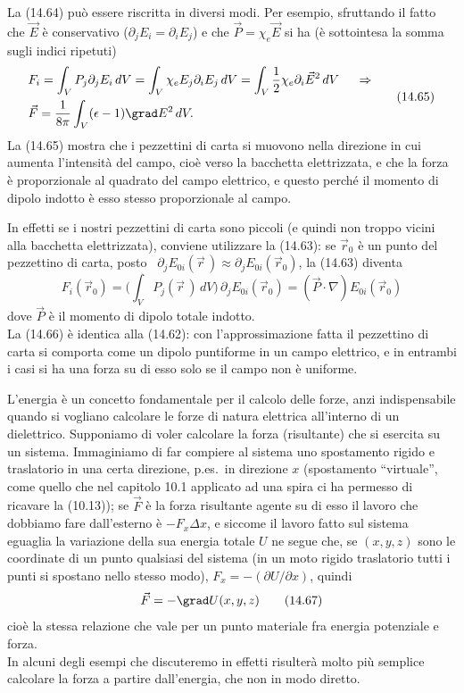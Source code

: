 La (14.64) pu\`o essere riscritta in diversi modi. Per esempio, sfruttando il
fatto che $\vec E$ \`e conservativo ($\partial_jE_i=\partial_iE_j$) e che
$\vec P=\chi_e\vec E$ si ha (\`e sottointesa la somma sugli indici ripetuti)
\begin{equation}
  \begin{aligned}
    &F_i=\int_VP_j\partial_jE_i\,dV=\int_V\chi_eE_j\partial_iE_j\,dV
    =\int_V\frac{1}{2}\chi_e\partial_i\vec E^2\,dV\quad\ \Rightarrow\\
    &\vec F=\frac{1}{8\pi}\int_V(\epsilon-1)\grad E^2\,dV.
  \end{aligned}
  \tag{14.65}
\end{equation}
La (14.65) mostra che i pezzettini di carta si muovono nella direzione in cui
aumenta l'intensit\`a del campo, cio\`e verso la bacchetta elettrizzata, e che
la forza \`e proporzionale al quadrato del campo elettrico, e questo perch\'e il
momento di dipolo indotto \`e esso stesso proporzionale al campo.

In effetti se i nostri pezzettini di carta sono piccoli (e quindi non troppo
vicini alla bacchetta elettrizzata), conviene utilizzare la (14.63): se
$\vec r_0$ \`e un punto del pezzettino di carta, posto
\ $\partial_jE_{0i}(\vec r\,)\approx\partial_jE_{0i}(\vec r_0)$, la (14.63)
diventa
\begin{equation}
  F_i(\vec r_0)=\Big(\int_VP_j(\vec r\,)\,dV\Big)\,\partial_jE_{0i}(\vec r_0)
  =(\vec P\cdot\nabla)E_{0i}(\vec r_0)
  \tag{14.66}
\end{equation}
dove $\vec P$ \`e il momento di dipolo totale indotto.\\
La (14.66) \`e identica alla (14.62): con l'approssimazione fatta il pezzettino
di carta si comporta come un dipolo puntiforme in un campo elettrico, e in
entrambi i casi si ha una forza su di esso solo se il campo non \`e uniforme.

L'energia \`e un concetto fondamentale per il calcolo delle forze, anzi
indispensabile quando si vogliano calcolare le forze di natura elettrica
all'interno di un dielettrico. Supponiamo di voler calcolare la forza
(risultante) che si esercita su un sistema. Immaginiamo di far compiere al
sistema uno spostamento rigido e traslatorio in una certa direzione, p.es.\ in
direzione $x$ \big(spostamento ``virtuale'', come quello che nel capitolo 10.1
applicato ad una spira ci ha permesso di ricavare la (10.13)\big); se $\vec F$
\`e la forza risultante agente su di esso il lavoro che dobbiamo fare
dall'esterno \`e $-F_x\Delta x$, e siccome il lavoro fatto sul sistema eguaglia
la variazione della sua energia totale $U$ ne segue che, se $(x,y,z)$ sono le
coordinate di un punto qualsiasi del sistema (in un moto rigido traslatorio
tutti i punti si spostano nello stesso modo), $F_x=-(\partial U/\partial x)$,
quindi
\begin{equation}
  \vec F=-\grad U(x,y,z)
  \tag{14.67}
\end{equation}
cio\`e la stessa relazione che vale per un punto materiale fra energia
potenziale e forza.\\
In alcuni degli esempi che discuteremo in effetti risulter\`a molto pi\`u
semplice calcolare la forza a partire dall'energia, che non in modo diretto.

